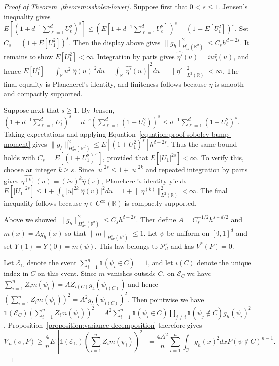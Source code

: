 \documentclass[letterpaper,12pt]{article}
\theoremstyle{definition}
\numberwithin{equation}{section}
\newcommand{\mc}{\mathcal}
\newcommand{\one}{\mathds{1}}
\newcommand{\norm}[1]{\lVert#1\rVert}
\begin{document}
\begin{proof}[Proof of Theorem~\ref{theorem:sobolev-lower}]
Suppose first that $0<s\leq1$. Jensen's inequality gives $E[(1+d^{-1}\sum_{\ell=1}^dU_\ell^2)^s]\leq(E[1+d^{-1}\sum_{\ell=1}^dU_\ell^2])^s=(1+E[U_1^2])^s$. Set $C_s=(1+E[U_1^2])^s$. Then the display above gives $\norm{g_h}_{H_{\mathrm{av}}^s(\mathbb R^d)}^2\leq C_sh^{d-2s}$. It remains to show $E[U_1^2]<\infty$. Integration by parts gives $\widehat{\eta'}(u)=iu\widehat\eta(u)$, and hence $E[U_1^2]=\int_{\mathbb R}u^2|\widehat\eta(u)|^2du=\int_{\mathbb R}|\widehat{\eta'}(u)|^2du=\norm{\eta'}_{L^2(\mathbb R)}^2<\infty$. The final equality is Plancherel's identity, and finiteness follows because $\eta$ is smooth and compactly supported.

Suppose next that $s\geq1$. By Jensen, $(1+d^{-1}\sum_{\ell=1}^dU_\ell^2)^s=d^{-s}(\sum_{\ell=1}^d(1+U_\ell^2))^s\leq d^{-1}\sum_{\ell=1}^d(1+U_\ell^2)^s$. Taking expectations and applying Equation~\eqref{equation:proof-sobolev-bump-moment} gives $\norm{g_h}_{H_{\mathrm{av}}^s(\mathbb R^d)}^2\leq E[(1+U_1^2)^s]h^{d-2s}$. Thus the same bound holds with $C_s=E[(1+U_1^2)^s]$, provided that $E[|U_1|^{2s}]<\infty$. To verify this, choose an integer $k\geq s$. Since $|u|^{2s}\leq1+|u|^{2k}$ and repeated integration by parts gives $\widehat{\eta^{(k)}}(u)=(iu)^k\widehat\eta(u)$, Plancherel's identity yields $E[|U_1|^{2s}]\leq1+\int_{\mathbb R}|u|^{2k}|\widehat\eta(u)|^2du=1+\norm{\eta^{(k)}}_{L^2(\mathbb R)}^2<\infty$. The final inequality follows because $\eta\in C^\infty(\mathbb R)$ is compactly supported.

Above we showed $\norm{g_h}_{H_{\mathrm{av}}^s(\mathbb R^d)}^2\leq C_sh^{d-2s}$. Then define $A=C_s^{-1/2}h^{s-d/2}$ and $m(x)=Ag_h(x)$ so that $\norm{m}_{H_{\mathrm{av}}^s(\mathbb R^d)}\leq1$. Let $\psi$ be uniform on $[0,1]^d$ and set $Y(1)=Y(0)=m(\psi)$. This law belongs to $\mc P_d^s$ and has $V^*(P)=0$.

Let $\mc E_C$ denote the event $\sum_{i=1}^n\one(\psi_i\in C)=1$, and let $i(C)$ denote the unique index in $C$ on this event. Since $m$ vanishes outside $C$, on $\mc E_C$ we have $\sum_{i=1}^nZ_im(\psi_i)=AZ_{i(C)}g_h(\psi_{i(C)})$ and hence $(\sum_{i=1}^nZ_im(\psi_i))^2=A^2g_h(\psi_{i(C)})^2$. 
Then pointwise we have $\one(\mc E_C)(\sum_{i=1}^nZ_im(\psi_i))^2=A^2\sum_{i=1}^n\one(\psi_i\in C)\prod_{j\neq i}\one(\psi_j\notin C)g_h(\psi_i)^2$. Proposition~\ref{proposition:variance-decomposition} therefore gives
\begin{equation*}
\mc V_n(\sigma,P)\geq\frac4nE[\one(\mc E_C)(\sum_{i=1}^nZ_im(\psi_i))^2] =\frac{4A^2}{n}\sum_{i=1}^n\int_Cg_h(x)^2dxP(\psi\notin C)^{n-1}.
\end{equation*}


\end{proof}
\end{document}
